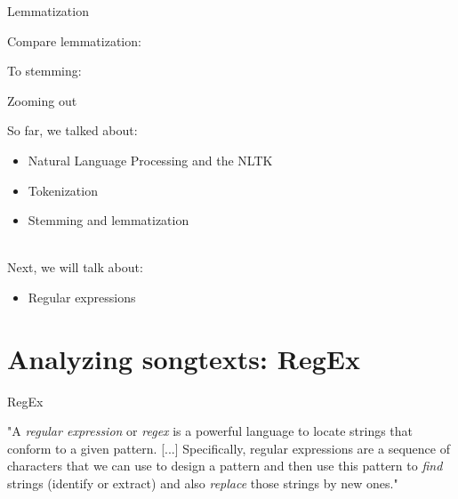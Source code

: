 \documentclass[handout]{beamer}
\begin{document}
\begin{frame}[fragile]{Lemmatization}
	
Compare lemmatization:

\begin{lstlistingoutput}
\end{lstlistingoutput}

To stemming:

\begin{lstlistingoutput}
\end{lstlistingoutput}

\end{frame}


\begin{frame}{Zooming out} 
	
So far, we talked about:
\begin{itemize}
	\item Natural Language Processing and the NLTK
	\item Tokenization
	\item Stemming and lemmatization \\\
\end{itemize}
	
Next, we will talk about:
\begin{itemize}
	\item Regular expressions
\end{itemize}
	
\end{frame}




\section{Analyzing songtexts: RegEx}


\begin{frame}[fragile]{RegEx}
	
	"A \textit{regular expression} or \textit{regex} is a powerful language to locate strings that conform to a given pattern. [...] Specifically, regular expressions are a sequence of characters that we can use to design a pattern and then use this pattern to \textit{find} strings (identify or extract) and also \textit{replace} those strings by new ones." \\
	\begin{tiny}
		\cite{van_atteveldt_computational_2022} 
	\end{tiny}
	

\end{frame}
\end{document}
